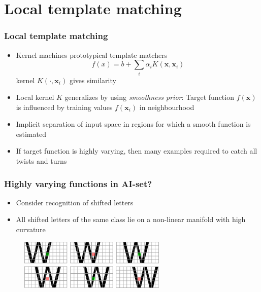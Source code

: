 \section{Local template matching}

\begin{frame}
	\frametitle{Local template matching}
	\begin{itemize}
		\item Kernel machines prototypical template matchers
		\begin{displaymath}
			f(x) = b + \sum_{i} \alpha_i K(\mathbf{x},\mathbf{x}_i)
		\end{displaymath}
		kernel $K(\cdot,\mathbf{x}_i)$ gives similarity
		\item Local kernel $K$ generalizes by using \emph{smoothness prior}: Target function $f(\mathbf{x})$ is influenced by training values $f(\mathbf{x}_i)$ in neighbourhood
		\item Implicit separation of input space in regions for which a smooth function is estimated
		\item If target function is highly varying, then many examples required to catch all twists and turns
	\end{itemize}
\end{frame}

\begin{frame}
	\frametitle{Highly varying functions in AI-set?}
	\begin{itemize}
		\item Consider recognition of shifted letters
		\item All shifted letters of the same class lie on a non-linear manifold with high curvature
	\end{itemize}
	\begin{figure}
		\centering
		\includegraphics[width=7cm]{images/shiftingW.png}
	\end{figure}
\end{frame}

